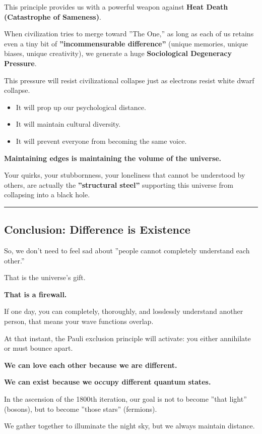 This principle provides us with a powerful weapon against \textbf{Heat Death (Catastrophe of Sameness)}.

When civilization tries to merge toward ''The One,'' as long as each of us retains even a tiny bit of \textbf{''incommensurable difference''} (unique memories, unique biases, unique creativity), we generate a huge \textbf{Sociological Degeneracy Pressure}.

This pressure will resist civilizational collapse just as electrons resist white dwarf collapse.

\begin{itemize}
\item It will prop up our psychological distance.

\item It will maintain cultural diversity.

\item It will prevent everyone from becoming the same voice.
\end{itemize}

\textbf{Maintaining edges is maintaining the volume of the universe.}

Your quirks, your stubbornness, your loneliness that cannot be understood by others, are actually the \textbf{''structural steel''} supporting this universe from collapsing into a black hole.

\hrule

\subsection{Conclusion: Difference is Existence}

So, we don't need to feel sad about ''people cannot completely understand each other.''

That is the universe's gift.

\textbf{That is a firewall.}

If one day, you can completely, thoroughly, and losslessly understand another person, that means your wave functions overlap.

At that instant, the Pauli exclusion principle will activate: you either annihilate or must bounce apart.

\textbf{We can love each other because we are different.}

\textbf{We can exist because we occupy different quantum states.}

In the ascension of the 1800th iteration, our goal is not to become ''that light'' (bosons), but to become ''those stars'' (fermions).

We gather together to illuminate the night sky, but we always maintain distance.

